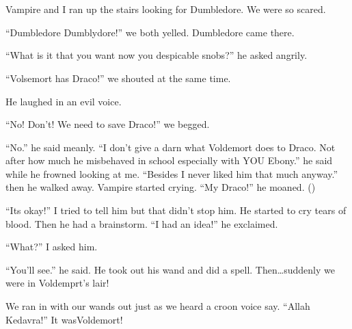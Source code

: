 \section{\chaptername~\thesection}


\XXX{\Xfill 666\Xfill}

Vampire and I ran up the stairs looking for Dumbledore. We were so scared.

\begin{sloppypar}
    \enquote{Dumbledore Dumblydore!} we both yelled. Dumbledore came there.
\end{sloppypar}

\enquote{What is it that you want now you despicable snobs?} he asked angrily.

\enquote{Volsemort has Draco!} we shouted at the same time.

He laughed in an evil voice.

\enquote{No! Don't! We need to save Draco!} we begged.

\enquote{No.} he said meanly. \enquote{I don't give a darn what Voldemort does to Draco. Not after how much he misbehaved in school especially with YOU Ebony.} he said while he frowned looking at me. \enquote{Besides I never liked him that much anyway.} then he walked away. Vampire started crying. \enquote{My Draco!} he moaned. ()

\enquote{Its okay!} I tried to tell him but that didn't stop him. He started to cry tears of blood. Then he had a brainstorm. \enquote{I had an idea!} he exclaimed.

\enquote{What?} I asked him.

\enquote{You'll see.} he said. He took out his wand and did a spell. Then\ldots suddenly we were in Voldemprt's lair!

We ran in with our wands out just as we heard a croon voice say. \enquote{Allah Kedavra!}
It was\dotfill Voldemort!
